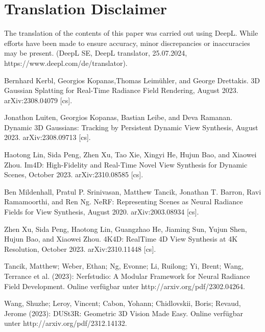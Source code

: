 \documentclass[conference]{IEEEtran}
\begin{document}
\section*{Translation Disclaimer}
The translation of the contents of this paper was carried out using DeepL. While efforts have been made to ensure accuracy, minor discrepancies or inaccuracies may be present. (DeepL SE, DeepL translator, 25.07.2024, https://www.deepl.com/de/translator).

\begin{thebibliography}{00}

Bernhard Kerbl, Georgios Kopanas,Thomas Leimühler, and George Drettakis. 3D Gaussian Splatting for Real-Time Radiance Field Rendering, August 2023. arXiv:2308.04079 [cs].

 Jonathon Luiten, Georgios Kopanas, Bastian Leibe, and Deva Ramanan. Dynamic 3D Gaussians: Tracking by Persistent Dynamic View Synthesis, August 2023. arXiv:2308.09713 [cs].

 Haotong Lin, Sida Peng, Zhen Xu, Tao Xie, Xingyi He, Hujun Bao, and Xiaowei Zhou. Im4D: High-Fidelity and Real-Time Novel
View Synthesis for Dynamic Scenes, October 2023. arXiv:2310.08585 [cs].

 Ben Mildenhall, Pratul P. Srinivasan, Matthew Tancik, Jonathan T. Barron, Ravi Ramamoorthi, and Ren Ng. NeRF: Representing Scenes as Neural Radiance Fields for View Synthesis, August 2020. arXiv:2003.08934  [cs].

 Zhen Xu, Sida Peng, Haotong Lin, Guangzhao He, Jiaming Sun, Yujun Shen, Hujun Bao, and Xiaowei Zhou. 4K4D: RealTime 4D View Synthesis at 4K Resolution, October 2023. arXiv:2310.11448  [cs].

 Tancik, Matthew; Weber, Ethan; Ng, Evonne; Li, Ruilong; Yi, Brent; Wang, Terrance et al. (2023): Nerfstudio: A Modular Framework for Neural Radiance Field Development. Online verfügbar unter http://arxiv.org/pdf/2302.04264.

 Wang, Shuzhe; Leroy, Vincent; Cabon, Yohann; Chidlovskii, Boris; Revaud, Jerome (2023): DUSt3R: Geometric 3D Vision Made Easy. Online verfügbar unter http://arxiv.org/pdf/2312.14132.

\end{thebibliography}

\vspace{12pt}
\end{document}

